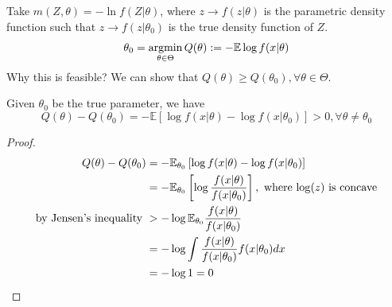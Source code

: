 \documentclass[11pt]{elegantbook}
\newcommand{\argmin}{\operatornamewithlimits{argmin}}
\begin{document}
\begin{example}[ (ML Identification)]
    Take $m(Z,\theta)=-\ln f(Z|\theta)$, where $z \rightarrow f(z|\theta)$ is the parametric density function such that $z \rightarrow f(z|\theta_0)$ is the true density function of $Z$.
    $$\theta_0=\argmin_{\theta\in\Theta} Q(\theta):=-\mathbb{E}\log f(x|\theta)$$
    Why this is feasible? We can show that $Q(\theta)\geq Q(\theta_0),\forall \theta\in\Theta$.
    \begin{lemma}[Information Inequality: $\theta_0=\argmin_{\theta\in\Theta} -\mathbb{E}\log f(x|\theta)$]
        \normalfont
        Given $\theta_0$ be the true parameter, we have $$Q(\theta)-Q(\theta_0)=-\mathbb{E}\left[\log f(x|\theta)-\log f(x|\theta_0)\right]>0,\forall \theta\neq \theta_0$$
    \end{lemma}
    \begin{proof}
        \begin{equation}
            \begin{aligned}
                Q(\theta)-Q(\theta_0)
                &=-\mathbb{E}_{\theta_0}\left[\log f(x|\theta)-\log f(x|\theta_0)\right]\\
                &=-\mathbb{E}_{\theta_0}\left[\log\frac{f(x|\theta)}{f(x|\theta_0)}\right], \textnormal{ where $\log(z)$ is concave}\\
                \textnormal{by Jensen's inequality }&>-\log \mathbb{E}_{\theta_0}\frac{f(x|\theta)}{f(x|\theta_0)}\\
                &=-\log \int\frac{f(x|\theta)}{f(x|\theta_0)}f(x|\theta_0)dx\\
                &=-\log 1=0
            \end{aligned}
            \nonumber
        \end{equation}
    \end{proof}
\end{example}
\end{document}
